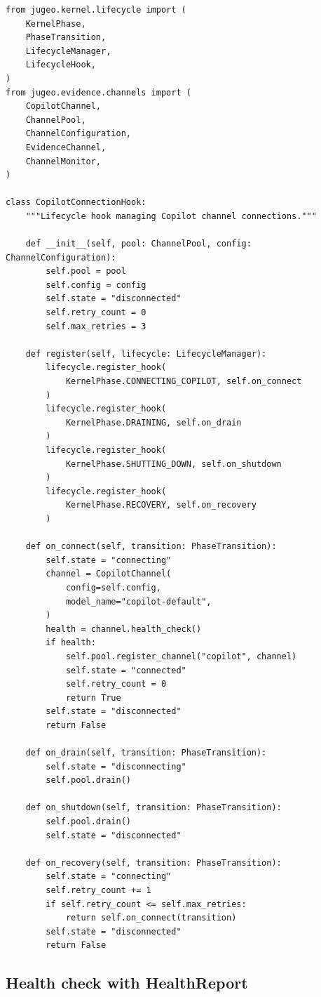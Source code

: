 \documentclass[11pt]{article}
\begin{document}
\begin{lstlisting}[style=jugeo-python,
  caption={Copilot connection hook with lifecycle manager},
  label={lst:connhook}]
from jugeo.kernel.lifecycle import (
    KernelPhase,
    PhaseTransition,
    LifecycleManager,
    LifecycleHook,
)
from jugeo.evidence.channels import (
    CopilotChannel,
    ChannelPool,
    ChannelConfiguration,
    EvidenceChannel,
    ChannelMonitor,
)

class CopilotConnectionHook:
    """Lifecycle hook managing Copilot channel connections."""

    def __init__(self, pool: ChannelPool, config: ChannelConfiguration):
        self.pool = pool
        self.config = config
        self.state = "disconnected"
        self.retry_count = 0
        self.max_retries = 3

    def register(self, lifecycle: LifecycleManager):
        lifecycle.register_hook(
            KernelPhase.CONNECTING_COPILOT, self.on_connect
        )
        lifecycle.register_hook(
            KernelPhase.DRAINING, self.on_drain
        )
        lifecycle.register_hook(
            KernelPhase.SHUTTING_DOWN, self.on_shutdown
        )
        lifecycle.register_hook(
            KernelPhase.RECOVERY, self.on_recovery
        )

    def on_connect(self, transition: PhaseTransition):
        self.state = "connecting"
        channel = CopilotChannel(
            config=self.config,
            model_name="copilot-default",
        )
        health = channel.health_check()
        if health:
            self.pool.register_channel("copilot", channel)
            self.state = "connected"
            self.retry_count = 0
            return True
        self.state = "disconnected"
        return False

    def on_drain(self, transition: PhaseTransition):
        self.state = "disconnecting"
        self.pool.drain()

    def on_shutdown(self, transition: PhaseTransition):
        self.pool.drain()
        self.state = "disconnected"

    def on_recovery(self, transition: PhaseTransition):
        self.state = "connecting"
        self.retry_count += 1
        if self.retry_count <= self.max_retries:
            return self.on_connect(transition)
        self.state = "disconnected"
        return False
\end{lstlisting}

\subsection{Health check with HealthReport}
\end{document}
